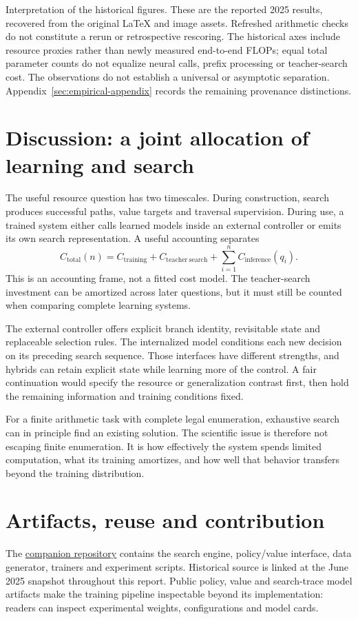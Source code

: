 \documentclass[11pt,letterpaper]{article}
\newcommand{\repo}{\href{https://github.com/RaychevAngel/classical_vs_contextual_search}{companion repository}}
\newcommand{\smallnote}[1]{{\small\color{ink}#1}}
\begin{document}
\smallnote{Interpretation of the historical figures. These are the reported 2025 results, recovered from the original LaTeX and image assets. Refreshed arithmetic checks do not constitute a rerun or retrospective rescoring. The historical axes include resource proxies rather than newly measured end-to-end FLOPs; equal total parameter counts do not equalize neural calls, prefix processing or teacher-search cost. The observations do not establish a universal or asymptotic separation. Appendix~\ref{sec:empirical-appendix} records the remaining provenance distinctions.}

\section{Discussion: a joint allocation of learning and search}
The useful resource question has two timescales. During construction, search produces successful paths, value targets and traversal supervision. During use, a trained system either calls learned models inside an external controller or emits its own search representation. A useful accounting separates
\begin{equation}
C_{\mathrm{total}}(n)=C_{\mathrm{training}}+C_{\mathrm{teacher\ search}}
+\sum_{i=1}^{n}C_{\mathrm{inference}}(q_i).
\end{equation}
This is an accounting frame, not a fitted cost model. The teacher-search investment can be amortized across later questions, but it must still be counted when comparing complete learning systems.

The external controller offers explicit branch identity, revisitable state and replaceable selection rules. The internalized model conditions each new decision on its preceding search sequence. Those interfaces have different strengths, and hybrids can retain explicit state while learning more of the control. A fair continuation would specify the resource or generalization contrast first, then hold the remaining information and training conditions fixed.

For a finite arithmetic task with complete legal enumeration, exhaustive search can in principle find an existing solution. The scientific issue is therefore not escaping finite enumeration. It is how effectively the system spends limited computation, what its training amortizes, and how well that behavior transfers beyond the training distribution.

\section{Artifacts, reuse and contribution}
The \repo{} contains the search engine, policy/value interface, data generator, trainers and experiment scripts. Historical source is linked at the June 2025 snapshot throughout this report. Public policy, value and search-trace model artifacts make the training pipeline inspectable beyond its implementation: readers can inspect experimental weights, configurations and model cards.
\end{document}
